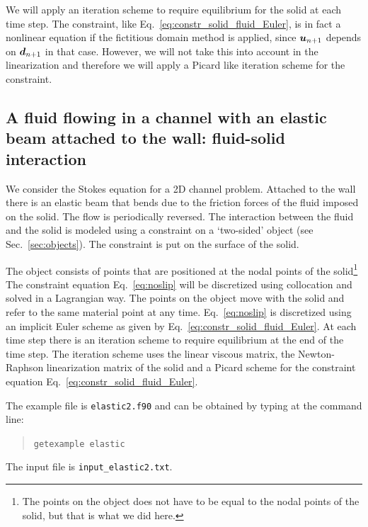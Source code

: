 We will apply 
an iteration scheme to require equilibrium for the solid at each time step.
The constraint, like Eq.~\eqref{eq:constr_solid_fluid_Euler}, is in fact a
nonlinear equation if the fictitious domain method is applied,
since $\boldsymbol{u}_{n+1}$ depends on $\boldsymbol{d}_{n+1}$ in that case. However, we will
not take this into account in the linearization and therefore we will apply a
Picard like iteration scheme for the constraint.

\subsection{A fluid flowing in a channel with an elastic beam attached to the
wall: fluid-solid interaction}
\label{sec:elastic2}
                                                                                
We consider the Stokes equation for a 2D channel problem. Attached to the wall
there is an elastic beam that bends due to the friction forces of the fluid
imposed on the solid. The flow is periodically reversed.
The interaction between the fluid and the solid is
modeled using a constraint on a `two-sided' object (see
Sec.~\ref{sec:objects}). The constraint is put on the surface of the solid.

The object consists of
points that are positioned at the nodal points of the solid\footnote{The points
on the object does not have to be equal to the nodal points of the solid, but
that is what we did here.}
The constraint equation
Eq.~\eqref{eq:noslip} will be discretized using collocation
and solved in a Lagrangian way. The
points on the object move with the solid and refer to the
same material point at any time. Eq.~\eqref{eq:noslip} is
discretized using an implicit Euler scheme as given by
Eq.~\eqref{eq:constr_solid_fluid_Euler}.
At each time step there is
an iteration scheme to require equilibrium at the end of the time step. The
iteration scheme uses the linear viscous matrix, the Newton-Raphson
linearization matrix of the solid and a Picard scheme for the constraint
equation Eq.~\eqref{eq:constr_solid_fluid_Euler}.

The example file is \texttt{elastic2.f90} and can be obtained by typing at the
command line:
\begin{quote}
   \texttt{getexample elastic}
\end{quote}
The input file is \texttt{input\_elastic2.txt}.
                                                                                
